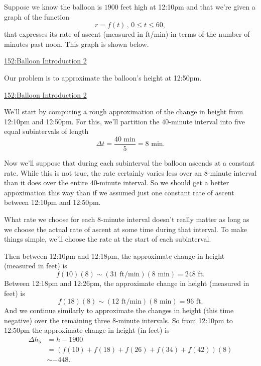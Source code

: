 \documentclass{ximera}
\begin{document}
\begin{example}  \label{Ex:98dfrghha}
Suppose we know the balloon is $1900$ feet high at 12:10pm and that we're given a graph of the function
\[
    r = f(t) \, , \, 0\leq t \leq  60 , 
\]
that expresses its rate of ascent (measured in ft/min) in terms of the number of minutes past noon. This graph is shown below.

\begin{onlineOnly}
    \begin{center}
\end{center}
\end{onlineOnly}

\href{https://www.desmos.com/calculator/h6cworakdw}{152:Balloon Introduction 2}

Our problem is to approximate the balloon's height at 12:50pm.


\begin{onlineOnly}
    \begin{center}
\end{center}
\end{onlineOnly}

\href{https://www.desmos.com/calculator/h6cworakdw}{152:Balloon Introduction 2}

We'll start by computing a rough approximation of the change in height from 12:10pm and 12:50pm. For this, we'll partition the $40$-minute interval into five equal subintervals of length 
\[
  \Delta t = \frac{40\text{ min}}{5} = 8 \text{ min}.
\]
 
Now we'll suppose that during each subinterval the balloon ascends at a constant rate. While this is not true, the rate certainly varies less over an $8$-minute interval than it does over the entire $40$-minute interval. So we should get a better appoximation  this way than if we assumed just one constant rate of ascent between 12:10pm and 12:50pm.

What rate we choose for each $8$-minute interval doesn't really matter as long as we choose the actual rate of ascent at some time during that interval. To make things simple, we'll choose the rate at the start of each subinterval. 

Then between 12:10pm and 12:18pm, the approximate change in height (measured in feet) is %
\[
        f(10)(8) \sim (31 \text{ ft/min})(8 \text{ min}) = 248 \text{ ft}. 
\]
Between 12:18pm and 12:26pm, the approximate change in height (measured in feet) is
\[
        f(18)(8) \sim (12 \text{ ft/min})(8 \text{ min}) = 96 \text{ ft}. 
\]
And we continue similarly to approximate the changes in height (this time negative) over the remaining three 8-minute intervals. So from 12:10pm to 12:50pm the approximate change in height (in feet) is
\begin{align*}
  \Delta h_5 &= h - 1900  \\
               &= (f(10) + f(18) + f(26)+ f(34) + f(42))(8) \\
               &\sim -448 .
\end{align*}


\end{example}
\end{document}
